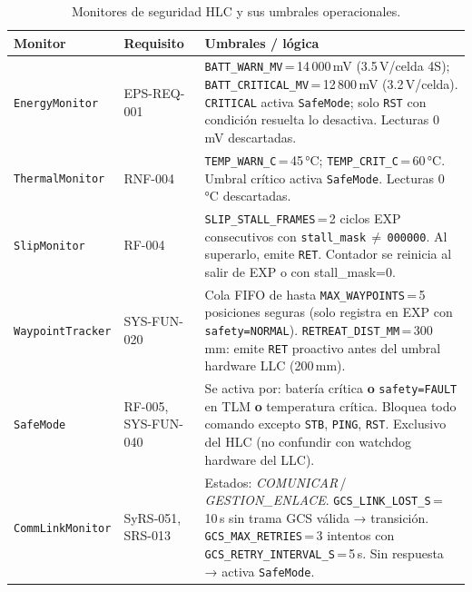 \begin{table}[H]
\centering
\small
\renewcommand{\arraystretch}{1.3}
\begin{tabular}{p{3.8cm} l p{6.5cm}}
\toprule
\textbf{Monitor} & \textbf{Requisito} & \textbf{Umbrales / lógica} \\
\midrule
\texttt{EnergyMonitor} & EPS-REQ-001 &
  \texttt{BATT\_WARN\_MV}\,=\,14\,000\,mV (3.5\,V/celda 4S);\newline
  \texttt{BATT\_CRITICAL\_MV}\,=\,12\,800\,mV (3.2\,V/celda).\newline
  \texttt{CRITICAL} activa \texttt{SafeMode}; solo \texttt{RST}
  con condición resuelta lo desactiva. Lecturas 0\,mV descartadas. \\
\texttt{ThermalMonitor} & RNF-004 &
  \texttt{TEMP\_WARN\_C}\,=\,45\,°C;\newline
  \texttt{TEMP\_CRIT\_C}\,=\,60\,°C.\newline
  Umbral crítico activa \texttt{SafeMode}. Lecturas 0\,°C descartadas. \\
\texttt{SlipMonitor} & RF-004 &
  \texttt{SLIP\_STALL\_FRAMES}\,=\,2 ciclos EXP consecutivos con
  \texttt{stall\_mask}\,$\neq$\,\texttt{000000}. Al superarlo, emite
  \texttt{RET}. Contador se reinicia al salir de EXP o con stall\_mask=0. \\
\texttt{WaypointTracker} & SYS-FUN-020 &
  Cola FIFO de hasta \texttt{MAX\_WAYPOINTS}\,=\,5 posiciones seguras
  (solo registra en EXP con \texttt{safety=NORMAL}).\newline
  \texttt{RETREAT\_DIST\_MM}\,=\,300\,mm: emite \texttt{RET} proactivo
  antes del umbral hardware LLC (200\,mm). \\
\texttt{SafeMode} & RF-005, SYS-FUN-040 &
  Se activa por: batería crítica \textbf{o} \texttt{safety=FAULT} en TLM
  \textbf{o} temperatura crítica.\newline
  Bloquea todo comando excepto \texttt{STB}, \texttt{PING}, \texttt{RST}.\newline
  Exclusivo del HLC (no confundir con watchdog hardware del LLC). \\
\texttt{CommLinkMonitor} & SyRS-051, SRS-013 &
  Estados: \textit{COMUNICAR}\,/\,\textit{GESTION\_ENLACE}.\newline
  \texttt{GCS\_LINK\_LOST\_S}\,=\,10\,s sin trama GCS válida → transición.\newline
  \texttt{GCS\_MAX\_RETRIES}\,=\,3 intentos con
  \texttt{GCS\_RETRY\_INTERVAL\_S}\,=\,5\,s.\newline
  Sin respuesta → activa \texttt{SafeMode}. \\
\bottomrule
\end{tabular}
\caption{Monitores de seguridad HLC y sus umbrales operacionales.}
\label{tab:icd_llc_monitors}
\end{table}

